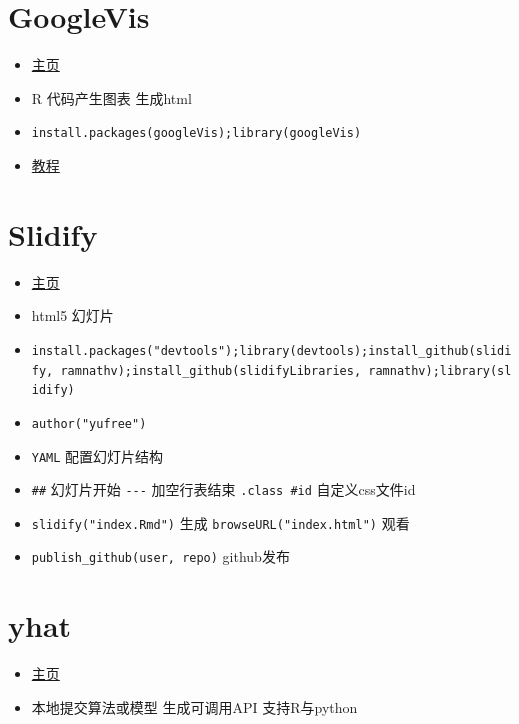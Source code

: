 \documentclass[
]{book}
\providecommand{\tightlist}{%
  \setlength{\itemsep}{0pt}\setlength{\parskip}{0pt}}
\begin{document}
\hypertarget{googlevis}{%
\section{GoogleVis}\label{googlevis}}

\begin{itemize}
\tightlist
\item
  \href{https://developers.google.com/chart/interactive/docs/gallery}{主页}
\item
  R 代码产生图表 生成html
\item
  \texttt{install.packages(\textquotesingle{}googleVis\textquotesingle{});library(googleVis)}
\item
  \href{http://decastillo.github.io/googleVis_Tutorial/}{教程}
\end{itemize}

\hypertarget{slidify}{%
\section{Slidify}\label{slidify}}

\begin{itemize}
\tightlist
\item
  \href{slidify.org}{主页}
\item
  html5 幻灯片
\item
  \texttt{install.packages("devtools");library(devtools);install\_github(\textquotesingle{}slidify\textquotesingle{},\ \textquotesingle{}ramnathv\textquotesingle{});install\_github(\textquotesingle{}slidifyLibraries\textquotesingle{},\ \textquotesingle{}ramnathv\textquotesingle{});library(slidify)}
\item
  \texttt{author("yufree")}
\item
  \texttt{YAML} 配置幻灯片结构
\item
  \texttt{\#\#} 幻灯片开始 \texttt{-\/-\/-} 加空行表结束 \texttt{.class\ \#id} 自定义css文件id
\item
  \texttt{slidify("index.Rmd")} 生成 \texttt{browseURL("index.html")} 观看
\item
  \texttt{publish\_github(user,\ repo)} github发布
\end{itemize}

\hypertarget{yhat}{%
\section{yhat}\label{yhat}}

\begin{itemize}
\tightlist
\item
  \href{https://yhathq.com/}{主页}
\item
  本地提交算法或模型 生成可调用API 支持R与python
\end{itemize}
\end{document}

